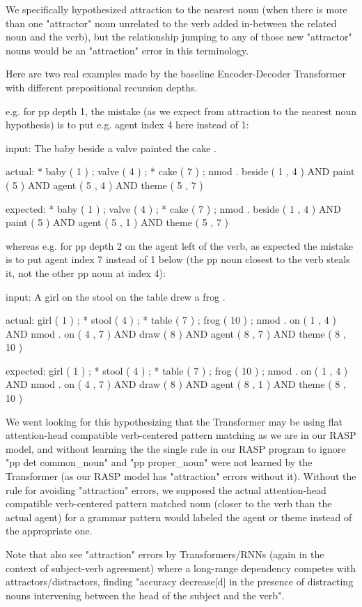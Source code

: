 \documentclass[11pt]{article}
\begin{document}
We specifically hypothesized attraction to the nearest noun (when there is more than one "attractor" noun unrelated to the verb added in-between the related noun and the verb), but the relationship jumping to any of those new "attractor" nouns would be an "attraction" error in this terminology.

Here are two real examples made by the \citep{Wu2023} baseline Encoder-Decoder Transformer with different prepositional recursion depths.

e.g. for pp depth 1, the mistake (as we expect from attraction to the nearest noun hypothesis) is to put e.g. agent index 4 here instead of 1:

input: The baby beside a valve painted the cake .

actual:   * baby ( 1 ) ; valve ( 4 ) ; * cake ( 7 ) ; nmod . beside ( 1 , 4 ) AND paint ( 5 ) AND agent ( 5 , 4 ) AND theme ( 5 , 7 )

expected: * baby ( 1 ) ; valve ( 4 ) ; * cake ( 7 ) ; nmod . beside ( 1 , 4 ) AND paint ( 5 ) AND agent ( 5 , 1 ) AND theme ( 5 , 7 )


whereas e.g. for pp depth 2 on the agent left of the verb, as expected the mistake is to put agent index 7 instead of 1 below (the pp noun closest to the verb steals it, not the other pp noun at index 4):

input: A girl on the stool on the table drew a frog .

actual:   girl ( 1 ) ; * stool ( 4 ) ; * table ( 7 ) ; frog ( 10 ) ; nmod . on ( 1 , 4 ) AND nmod . on ( 4 , 7 ) AND draw ( 8 ) AND agent ( 8 , 7 ) AND theme ( 8 , 10 )

expected: girl ( 1 ) ; * stool ( 4 ) ; * table ( 7 ) ; frog ( 10 ) ; nmod . on ( 1 , 4 ) AND nmod . on ( 4 , 7 ) AND draw ( 8 ) AND agent ( 8 , 1 ) AND theme ( 8 , 10 )

We went looking for this hypothesizing that the \citep{Wu2023} Transformer may be using flat attention-head compatible verb-centered pattern matching as we are in our RASP model,
and without learning the the single rule in our RASP program to ignore "pp det common\_noun" and "pp proper\_noun" were not learned by the Transformer (as our RASP model has "attraction" errors without it). Without the rule for avoiding "attraction" errors, we supposed the actual attention-head compatible verb-centered pattern matched noun (closer to the verb than the actual agent) for a grammar pattern would labeled the agent or theme instead of the appropriate one.

Note that \citep{vanschijndel2019quantitydoesntbuyquality} also see "attraction" errors by Transformers/RNNs (again in the context of subject-verb agreement) where a long-range dependency competes with attractors/distractors, finding "accuracy decrease[d] in the presence of distracting nouns intervening between the head of the subject and the verb".
\end{document}
